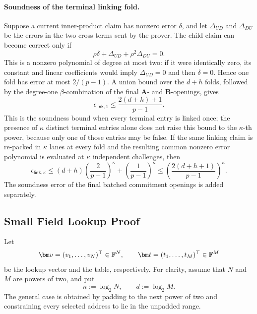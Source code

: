 \documentclass[runningheads]{llncs}
\begin{document}
\paragraph{Soundness of the terminal linking fold.}
Suppose a current inner-product claim has nonzero error \(\delta\), and
let \(\Delta_{UD}\) and \(\Delta_{DU}\) be the errors in the two cross
terms sent by the prover.  The child claim can become correct only if
\begin{equation}
    \rho\delta
      +\Delta_{UD}
      +\rho^2\Delta_{DU}
      =0.
\label{eq:wht-link-error-polynomial}
\end{equation}
This is a nonzero polynomial of degree at most two: if it were
identically zero, its constant and linear coefficients would imply
\(\Delta_{UD}=0\) and then \(\delta=0\).  Hence one fold has error at
most \(2/(p-1)\).  A union bound over the \(d+h\) folds, followed by
the degree-one \(\beta\)-combination of the final \(\bm A\)- and
\(\bm B\)-openings, gives
\begin{equation}
    \boxed{
    \epsilon_{\mathsf{link},1}
      \leq
      \frac{2(d+h)+1}{p-1}.
    }
\label{eq:wht-link-soundness}
\end{equation}
This is the soundness bound when every terminal entry is linked once;
the presence of \(\kappa\) distinct terminal entries alone does not
raise this bound to the \(\kappa\)-th power, because only one of those
entries may be false.  If the same linking claim is re-packed in
\(\kappa\) lanes at every fold and the resulting common nonzero error
polynomial is evaluated at \(\kappa\) independent challenges, then
\begin{equation}
    \epsilon_{\mathsf{link},\kappa}
      \leq
      (d+h)\left(\frac{2}{p-1}\right)^\kappa
      +\left(\frac{1}{p-1}\right)^\kappa
      \leq
      \left(\frac{2(d+h+1)}{p-1}\right)^\kappa.
\label{eq:wht-link-amplified-soundness}
\end{equation}
The soundness error of the final batched commitment openings is added
separately.

\subsection{Small Field Lookup Proof}
\label{sec:lookup}

Let
\[
    \bm v=(v_1,\ldots,v_N)^\top\in\Field^N,
    \qquad
    \bm t=(t_1,\ldots,t_M)^\top\in\Field^M
\]
be the lookup vector and the table, respectively.  For clarity, assume
that \(N\) and \(M\) are powers of two, and put
\[
    n:=\log_2N,
    \qquad
    d:=\log_2M.
\]
The general case is obtained by padding to the next power of two and
constraining every selected address to lie in the unpadded range.
\end{document}
